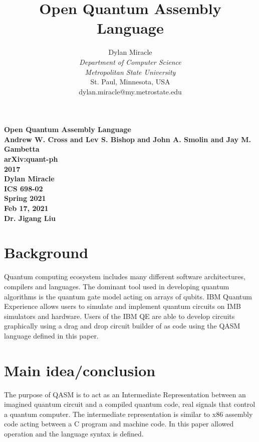 \documentclass{article}
\begin{document}
\begin{titlepage}
    \begin{center}
        \vspace{4cm}
        \large
        \textbf{
            Open Quantum Assembly Language \\
            Andrew W. Cross and Lev S. Bishop and John A. Smolin and Jay M. Gambetta \\
            arXiv:quant-ph \\
            2017 \\
            Dylan Miracle \\
            ICS 698-02 \\
            Spring 2021 \\
            Feb 17, 2021 \\
            Dr. Jigang Liu
        }
    \end{center}
\end{titlepage}
\title{Open Quantum Assembly Language}

\author{Dylan Miracle\\
\textit{Department of Computer Science} \\
\textit{Metropolitan State University}\\
St. Paul, Minnesota, USA \\
dylan.miracle@my.metrostate.edu
}

\maketitle

\section{Background}
Quantum computing ecosystem includes many different software architectures, compilers and languages. The dominant tool used in developing quantum algorithms is the quantum gate model acting on arrays of qubits. IBM Quantum Experience allows users to simulate and implement quantum circuits on IMB simulators and hardware. Users of the IBM QE are able to develop circuits graphically using a drag and drop circuit builder of as code using the QASM language defined in this paper.


\section{Main idea/conclusion}
The purpose of QASM is to act as an Intermediate Representation between an imagined quantum circuit and a compiled quantum code, real signals that control a quantum computer. The intermediate representation is similar to x86 assembly code acting between a C program and machine code. In this paper allowed operation and the language syntax is defined. 
\end{document}
